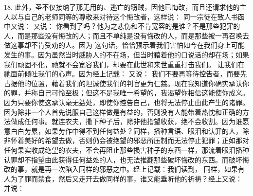 18. 此外，圣不仅接纳了那无用的、逃亡的窃贼，因他已悔改，而且还请求他的主人以与自己的老师同等的尊敬来对待这个悔改者，这样说： 同一宗徒在致人书函中又说： 又说： 你看到了吗？他为之悲伤和不肯宽容的是谁？不是那些犯罪的人，而是那些没有悔改的人；而且不单纯是没有悔改的人，而是那些被一再召唤去做这事却不肯受劝的人。因为 这句话，恰恰预示着我们害怕如今在我们身上可能发生的事。因为虽然当时威胁人的不在场，但当时藉着他的口说话的却在场；如果我们顽固不化，祂就不会宽容我们，却要在此世和来世重重打击我们。 让我们在祂面前倾吐我们的心声。因为经上记载： 又说： 我们不要再等待控告者，而要先占据他的位置，藉着我们的坦诚使我们的判官更为仁慈。现在我知道你确实承认你的罪，并称自己可怜至极；但这不是我唯一希望的，我渴望你相信这能使你成义。因为只要你使这承认毫无益处，即使你控告自己，也将无法停止由此产生的诸罪。因为除非一个人首先说服自己这样做是有益的，否则没有人能带着热忱和正确的方法做成任何事。就连农夫，撒下种子后，除非他指望收获，绝不会收割。因为谁愿意白白劳累，如果劳作中得不到任何益处？同样，播种言语、眼泪和认罪的人，除非怀着美好的希望去做，否则仍会被绝望的邪恶所压制而无法停止犯罪；正如那对任何果实收成绝望的农夫，不会再阻止那些损害种子的东西一样，那流着眼泪播种认罪却不指望由此获得任何益处的人，也无法推翻那些破坏悔改的东西。而破坏悔改的事，就是再一次陷入同样的邪恶之中。经上记载：我们读到， 同样，如果有人为了罪而禁食，然后又走开去做同样的事，谁又能垂听他的祈祷？经上又说： 并说：\par

